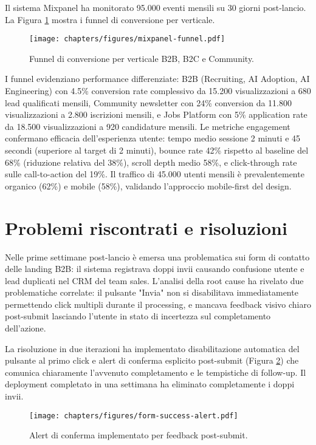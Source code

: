 Il sistema Mixpanel ha monitorato 95.000 eventi mensili su 30 giorni post-lancio. 
La Figura \ref{fig:mixpanel-funnel} mostra i funnel di conversione per verticale.

\begin{figure}[h!]
    \centering
    \texttt{[image: chapters/figures/mixpanel-funnel.pdf]}
    \caption{Funnel di conversione per verticale B2B, B2C e Community.}
    \label{fig:mixpanel-funnel}
\end{figure}

I funnel evidenziano performance differenziate: B2B (Recruiting, AI Adoption, AI 
Engineering) con 4.5\% conversion rate complessivo da 15.200 visualizzazioni a 
680 lead qualificati mensili, Community newsletter con 24\% conversion da 11.800 
visualizzazioni a 2.800 iscrizioni mensili, e Jobs Platform con 5\% application 
rate da 18.500 visualizzazioni a 920 candidature mensili. Le metriche engagement 
confermano efficacia dell'esperienza utente: tempo medio sessione 2 minuti e 45 
secondi (superiore al target di 2 minuti), bounce rate 42\% rispetto al baseline 
del 68\% (riduzione relativa del 38\%), scroll depth medio 58\%, e click-through 
rate sulle call-to-action del 19\%. Il traffico di 45.000 utenti mensili è 
prevalentemente organico (62\%) e mobile (58\%), validando l'approccio mobile-first 
del design.

\section{Problemi riscontrati e risoluzioni}

Nelle prime settimane post-lancio è emersa una problematica sui form di contatto 
delle landing B2B: il sistema registrava doppi invii causando confusione utente 
e lead duplicati nel CRM del team sales. L'analisi della root cause ha rivelato 
due problematiche correlate: il pulsante "Invia" non si disabilitava immediatamente 
permettendo click multipli durante il processing, e mancava feedback visivo chiaro 
post-submit lasciando l'utente in stato di incertezza sul completamento dell'azione.

La risoluzione in due iterazioni ha implementato disabilitazione automatica del 
pulsante al primo click e alert di conferma esplicito post-submit (Figura 
\ref{fig:form-success}) che comunica chiaramente l'avvenuto completamento e le 
tempistiche di follow-up. Il deployment completato in una settimana ha eliminato 
completamente i doppi invii.

\begin{figure}[h!]
    \centering
    \texttt{[image: chapters/figures/form-success-alert.pdf]}
    \caption{Alert di conferma implementato per feedback post-submit.}
    \label{fig:form-success}
\end{figure}

